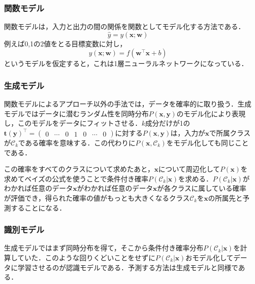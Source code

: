 \documentclass[a4paper,11pt]{jsreport}
\begin{document}
\subsubsection*{関数モデル}
関数モデルは，入力と出力の間の関係を関数としてモデル化する方法である．
\begin{equation}
  \hat{y} = y(\bm{x}; \bm{w})
\end{equation}
例えば0,1の2値をとる目標変数に対し，
\begin{equation}
  y(\bm{x}; \bm{w}) = f(\bm{w}^{\top} \bm{x} + b)
\end{equation}
というモデルを仮定すると，これは1層ニューラルネットワークになっている．

\subsubsection*{生成モデル}
関数モデルによるアプローチ以外の手法では，データを確率的に取り扱う．生成モデルではデータに潜むランダム性を同時分布$P(\bm{x}, \bm{y})$のモデル化により表現し，このモデルをデータにフィットさせる．$k$成分だけが1の$\bm{t}(\bm{y})^{\top} = \begin{pmatrix} 0 & \cdots & 0 & 1 & 0 & \cdots & 0 \end{pmatrix}$に対する$P(\bm{x}, \bm{y})$は，入力が$\bm{x}$で所属クラスが$\mathcal{C}_k$である確率を意味する．この代わりに$P(\bm{x}, \mathcal{C}_k)$をモデル化しても同じことである．\par
この確率をすべてのクラスについて求めたあと，$\bm{x}$について周辺化して$P(\bm{x})$を求めてベイズの公式を使うことで条件付き確率$P(\mathcal{C}_k | \bm{x})$を求める．$P(\mathcal{C}_k | \bm{x})$がわかれば任意のデータ$\bm{x}$がわかれば任意のデータ$\bm{x}$が各クラスに属している確率が評価でき，得られた確率の値がもっとも大きくなるクラス$\mathcal{C}_k$を$\bm{x}$の所属先と予測することになる．

\subsubsection*{識別モデル}
生成モデルではまず同時分布を得て，そこから条件付き確率分布$P(\mathcal{C}_k | \bm{x})$を計算していた．このような回りくどいことをせずに$P(\mathcal{C}_k | \bm{x})$おモデル化してデータに学習させるのが認識モデルである．予測する方法は生成モデルと同様である．
\end{document}
